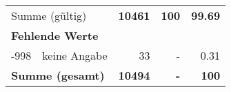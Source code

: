 \begin{longtable}{lXrrr}
     \midrule
     \multicolumn{2}{l}{Summe (gültig)} &
       \textbf{\num{10461}} &
     \textbf{100} &
       \textbf{\num[round-mode=places,round-precision=2]{99,69}} \\
     \multicolumn{5}{l}{\textbf{Fehlende Werte}}\\
       -998 &
       keine Angabe &
         \num{33} &
        - &
         \num[round-mode=places,round-precision=2]{0,31} \\
     \midrule
     \multicolumn{2}{l}{\textbf{Summe (gesamt)}} &
          \textbf{\num{10494}} &
        \textbf{-} &
        \textbf{100} \\
     \bottomrule
     \end{longtable}
     
